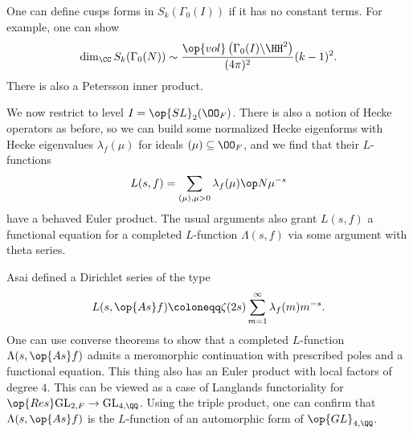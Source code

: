 \documentclass{article}
\begin{document}
One can define cusps forms in $S_k(\Gamma_0(I))$ if it has no constant terms. For example, one can show
\[\dim_\CC S_k(\Gamma_0(N))\sim\frac{\op{vol}\left(\Gamma_0(I)\backslash\HH^2\right)}{(4\pi)^2}(k-1)^2.\]
There is also a Petersson inner product.

We now restrict to level $I=\op{SL}_2(\OO_F)$. There is also a notion of Hecke operators as before, so we can build some normalized Hecke eigenforms with Hecke eigenvalues $\lambda_f(\mu)$ for ideals $(\mu)\subseteq\OO_F$, and we find that their $L$-functions
\[L(s,f)=\sum_{(\mu),\mu>0}\lambda_f(\mu)\op N\mu^{-s}\]
have a behaved Euler product. The usual arguments also grant $L(s,f)$ a functional equation for a completed $L$-function $\Lambda(s,f)$ via some argument with theta series.

Asai defined a Dirichlet series of the type
\[L(s,\op{As}f)\coloneqq\zeta(2s)\sum_{m=1}^\infty\lambda_f(m)m^{-s}.\]
One can use converse theorems to show that a completed $L$-function $\Lambda(s,\op{As}f)$ admits a meromorphic continuation with prescribed poles and a functional equation. This thing also has an Euler product with local factors of degree $4$. This can be viewed as a case of Langlands functoriality for $\op{Res}\mathrm{GL}_{2,F}\to\mathrm{GL}_{4,\QQ}$. Using the triple product, one can confirm that $\Lambda(s,\op{As}f)$ is the $L$-function of an automorphic form of $\op{GL}_{4,\QQ}$.
\end{document}
